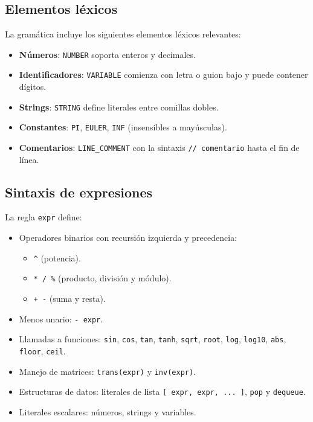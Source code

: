 \documentclass[stu, 12pt, letterpaper, donotrepeattitle, floatsintext, natbib]{apa7}
\begin{document}
\subsection{Elementos léxicos}
La gramática incluye los siguientes elementos léxicos relevantes:
\begin{itemize}
  \item \textbf{Números}: \texttt{NUMBER} soporta enteros y decimales.
  \item \textbf{Identificadores}: \texttt{VARIABLE} comienza con letra o guion bajo y puede contener dígitos.
  \item \textbf{Strings}: \texttt{STRING} define literales entre comillas dobles.
  \item \textbf{Constantes}: \texttt{PI}, \texttt{EULER}, \texttt{INF} (insensibles a mayúsculas).
  \item \textbf{Comentarios}: \texttt{LINE\_COMMENT} con la sintaxis \texttt{// comentario} hasta el fin de línea.
\end{itemize}

\subsection{Sintaxis de expresiones}
La regla \texttt{expr} define:
\begin{itemize}
  \item Operadores binarios con recursión izquierda y precedencia:
  \begin{itemize}
    \item \texttt{\^{}} (potencia).
    \item \texttt{* / \%} (producto, división y módulo).
    \item \texttt{+ -} (suma y resta).
  \end{itemize}
  \item Menos unario: \texttt{- expr}.
  \item Llamadas a funciones: \texttt{sin}, \texttt{cos}, \texttt{tan}, \texttt{tanh}, \texttt{sqrt}, \texttt{root}, \texttt{log}, \texttt{log10}, \texttt{abs}, \texttt{floor}, \texttt{ceil}.
  \item Manejo de matrices: \texttt{trans(expr)} y \texttt{inv(expr)}.
  \item Estructuras de datos: literales de lista \texttt{[ expr, expr, ... ]}, \texttt{pop} y \texttt{dequeue}.
  \item Literales escalares: números, strings y variables.
\end{itemize}
\end{document}
